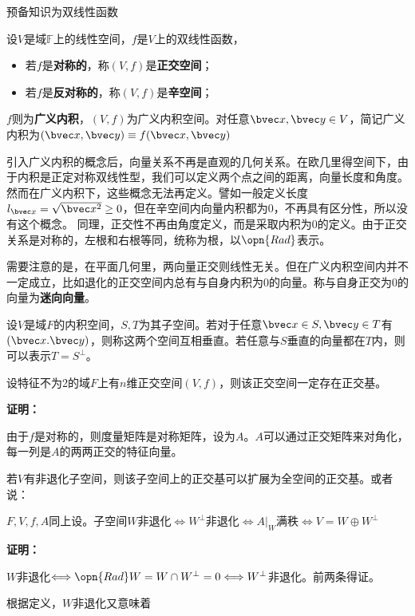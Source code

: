 

\begin{issues}
\issueDraft 预备知识为双线性函数
\end{issues}

\begin{definition}{}
设$V$是域$\mathbb F$上的线性空间，$f$是$V$上的双线性函数，
\begin{itemize}
\item 若$f$是\textbf{对称的}，称$(V,f)$是\textbf{正交空间}；
\item 若$f$是\textbf{反对称的}，称$(V,f)$是\textbf{辛空间}；
\end{itemize}
$f$则为\textbf{广义内积}，$(V,f)$为广义内积空间。对任意$\bvec x,\bvec y\in V$，简记广义内积为$(\bvec x,\bvec y)\equiv f(\bvec x,\bvec y)$
\end{definition}
引入广义内积的概念后，向量关系不再是直观的几何关系。在欧几里得空间下，由于内积是正定对称双线性型，我们可以定义两个点之间的距离，向量长度和角度。然而在广义内积下，这些概念无法再定义。譬如一般定义长度$l_{\bvec x}=\sqrt{\bvec x^2}\ge 0$，但在辛空间内向量内积都为0，不再具有区分性，所以没有这个概念。
同理，正交性不再由角度定义，而是采取内积为$0$的定义。由于正交关系是对称的，左根和右根等同，统称为根，以$\opn{Rad}$表示。

需要注意的是，在平面几何里，两向量正交则线性无关。但在广义内积空间内并不一定成立，比如退化的正交空间内总有与自身内积为0的向量。称与自身正交为$0$的向量为\textbf{迷向向量}。

\begin{definition}{}
设$V$是域$F$的内积空间，$S,T$为其子空间。若对于任意$\bvec x\in S,\bvec  y\in T$有$(\bvec x.\bvec y)$，则称这两个空间互相垂直。若任意与$S$垂直的向量都在$T$内，则可以表示$T=S^{\bot}$。
\end{definition}
\begin{theorem}{}
设特征不为2的域$F$上有$n$维正交空间$(V,f)$，则该正交空间一定存在正交基。
\end{theorem}
\textbf{证明：}

由于$f$是对称的，则度量矩阵是对称矩阵，设为$A$。$A$可以通过正交矩阵来对角化，每一列是$A$的两两正交的特征向量。

若$V$有非退化子空间，则该子空间上的正交基可以扩展为全空间的正交基。或者说：

\begin{theorem}{}
$F,V,f,A$同上设。子空间$W$非退化$\Longleftrightarrow  W^{\bot}$非退化$\Longleftrightarrow A|_{W}$满秩$\Longleftrightarrow V=W\oplus W^{\bot}$
\end{theorem}
\textbf{证明：}

$W$非退化$\Longleftrightarrow \opn{Rad}W=W\cap W^{\bot}=0\Longleftrightarrow  W^{\bot}$非退化。前两条得证。

根据定义，$W$非退化又意味着

